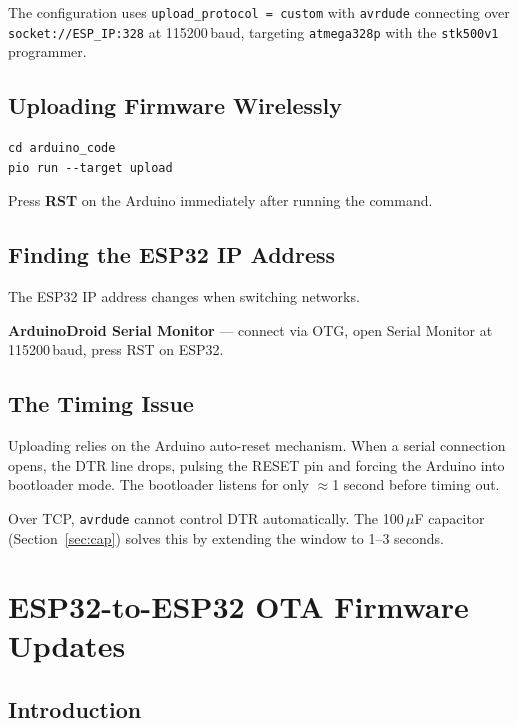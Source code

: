 \documentclass[11pt, a4paper]{article}
\begin{document}
The configuration uses \texttt{upload\_protocol = custom} with \texttt{avrdude}
connecting over \texttt{socket://ESP\_IP:328} at 115200\,baud, targeting
\texttt{atmega328p} with the \texttt{stk500v1} programmer.

\subsection{Uploading Firmware Wirelessly}

\begin{lstlisting}[caption={Build and upload}]
cd arduino_code
pio run --target upload
\end{lstlisting}

Press \textbf{RST} on the Arduino immediately after running the command.

\subsection{Finding the ESP32 IP Address}

The ESP32 IP address changes when switching networks.

\textbf{ArduinoDroid Serial Monitor} --- connect via OTG, open Serial Monitor
at 115200\,baud, press RST on ESP32.

\subsection{The Timing Issue}

Uploading relies on the Arduino auto-reset mechanism. When a serial connection
opens, the DTR line drops, pulsing the RESET pin and forcing the Arduino into
bootloader mode. The bootloader listens for only $\approx$1 second before
timing out.

Over TCP, \texttt{avrdude} cannot control DTR automatically. The
100\,$\mu$F capacitor (Section~\ref{sec:cap}) solves this by extending the
window to 1--3 seconds.

\newpage
\section{ESP32-to-ESP32 OTA Firmware Updates}

\subsection{Introduction}
\end{document}
